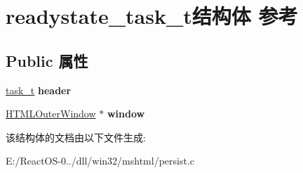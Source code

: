 \hypertarget{structreadystate__task__t}{}\section{readystate\+\_\+task\+\_\+t结构体 参考}
\label{structreadystate__task__t}
\subsection*{Public 属性}
\begin{DoxyCompactItemize}
\item 
\mbox{\label{structreadystate__task__t_aa0677d684282f3de531de40b4240e949}} 
\hyperlink{structtask__t}{task\+\_\+t} {\bfseries header}
\item 
\mbox{\label{structreadystate__task__t_a927ca8149619a21a649850a3c40df61c}} 
\hyperlink{struct_h_t_m_l_outer_window}{H\+T\+M\+L\+Outer\+Window} $\ast$ {\bfseries window}
\end{DoxyCompactItemize}


该结构体的文档由以下文件生成\+:\begin{DoxyCompactItemize}
\item 
E\+:/\+React\+O\+S-\/0../dll/win32/mshtml/persist.\+c\end{DoxyCompactItemize}
